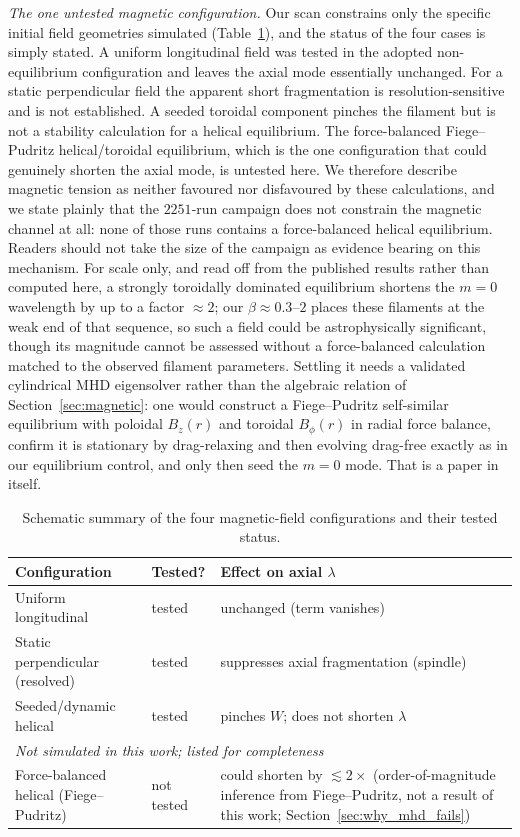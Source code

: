 \documentclass[usenatbib,twoside,twocolumn]{mnras}
\begin{document}
\emph{The one untested magnetic configuration.} Our scan constrains only the specific initial field geometries simulated (Table~\ref{tab:magcases}), and the status of the four cases is simply stated. A uniform longitudinal field was tested in the adopted non-equilibrium configuration and leaves the axial mode essentially unchanged. For a static perpendicular field the apparent short fragmentation is resolution-sensitive and is not established. A seeded toroidal component pinches the filament but is not a stability calculation for a helical equilibrium. The force-balanced Fiege--Pudritz helical/toroidal equilibrium, which is the one configuration that could genuinely shorten the axial mode, is untested here. We therefore describe magnetic tension as neither favoured nor disfavoured by these calculations, and we state plainly that the $2251$-run campaign does not constrain the magnetic channel at all: none of those runs contains a force-balanced helical equilibrium. Readers should not take the size of the campaign as evidence bearing on this mechanism. For scale only, and read off from the published \citet{Fiege2000} results rather than computed here, a strongly toroidally dominated equilibrium shortens the $m=0$ wavelength by up to a factor $\approx2$; our $\beta\approx0.3$--$2$ places these filaments at the weak end of that sequence, so such a field could be astrophysically significant, though its magnitude cannot be assessed without a force-balanced calculation matched to the observed filament parameters. Settling it needs a validated cylindrical MHD eigensolver rather than the algebraic relation of Section~\ref{sec:magnetic}: one would construct a Fiege--Pudritz self-similar equilibrium with poloidal $B_z(r)$ and toroidal $B_\phi(r)$ in radial force balance, confirm it is stationary by drag-relaxing and then evolving drag-free exactly as in our equilibrium control, and only then seed the $m=0$ mode. That is a paper in itself.

\begin{table}
\caption{Schematic summary of the four magnetic-field configurations and their tested status.}
\label{tab:magcases}
\footnotesize
\setlength{\tabcolsep}{4pt}
\begin{tabular}{@{}p{2.9cm}lp{3.0cm}@{}}
\toprule
Configuration & Tested? & Effect on axial $\lambda$ \\
\midrule
Uniform longitudinal & tested & unchanged (term vanishes) \\
Static perpendicular (resolved) & tested & suppresses axial fragmentation (spindle) \\
Seeded/dynamic helical & tested & pinches $W$; does not shorten $\lambda$ \\
\midrule
\multicolumn{3}{l}{\emph{Not simulated in this work; listed for completeness}}\\
Force-balanced helical (Fiege--Pudritz) & not tested & could shorten by $\lesssim2\times$ (order-of-magnitude inference from Fiege--Pudritz, not a result of this work; Section~\ref{sec:why_mhd_fails}) \\
\bottomrule
\end{tabular}
\end{table}
\end{document}
